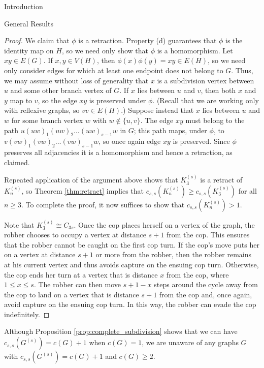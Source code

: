 \documentclass[12pt]{amsart}
\newcommand{\comment}[1]{\textcolor{red}{#1}}
\newtheorem{conjecture}[lemma]{Conjecture}
\theoremstyle{definition}
\newcommand{\speeds}{c_{s,s}}
\begin{document}
\begin{section}{Introduction}
\begin{section}{General Results}
\begin{proof}
We claim that $\phi$ is a retraction.  Property (d) guarantees that $\phi$ is the identity map on $H$, so we need only show that $\phi$ is a homomorphism.  Let $xy \in E(G)$.  If $x,y \in V(H)$, then $\phi(x)\phi(y) = xy \in E(H)$, so we need only consider edges for which at least one endpoint does not belong to $G$.  Thus, we may assume without loss of generality that $x$ is a subdivision vertex between $u$ and some other branch vertex of $G$.  If $x$ lies between $u$ and $v$, then both $x$ and $y$ map to $v$, so the edge $xy$ is preserved under $\phi$.  (Recall that we are working only with reflexive graphs, so $vv \in E(H)$.)  Suppose instead that $x$ lies between $u$ and $w$ for some branch vertex $w$ with $w \not\in \{u,v\}$.  The edge $xy$ must belong to the path $u(uw)_1(uw)_2\dots (uw)_{s-1}w$ in $G$; this path maps, under $\phi$, to $v(vw)_1(vw)_2\dots (vw)_{s-1}w$, so once again edge $xy$ is preserved.  Since $\phi$ preserves all adjacencies it is a homomorphism and hence a retraction, as claimed.

Repeated application of the argument above shows that $K_3^{(s)}$ is a retract of $K_n^{(s)}$, so Theorem \ref{thm:retract} implies that $\speeds(K_n^{(s)}) \ge \speeds(K_{3}^{(s)})$ for all $n\ge 3$.  To complete the proof, it now suffices to show that $\speeds(K_n^{(s)}) > 1$.  

Note that $K_3^{(s)}\cong C_{3s}$.  Once the cop places herself on a vertex of the graph, the robber chooses to occupy a vertex at distance $s+1$ from the cop.  This ensures that the robber cannot be caught on the first cop turn.  If the cop's move puts her on a vertex at distance $s+1$ or more from the robber, then the robber remains at his current vertex and thus avoids capture on the ensuing cop turn.  Otherwise, the cop ends her turn at a vertex that is distance $x$ from the cop, where $1\le x\le s$.  The robber can then move $s+1-x$ steps around the cycle away from the cop to land on a vertex that is distance $s+1$ from the cop and, once again, avoid capture on the ensuing cop turn.  In this way, the robber can evade the cop indefinitely.
\end{proof}

Although Proposition \ref{prop:complete_subdivision} shows that we can have $\speeds(G^{(s)}) = c(G)+1$ when $c(G) = 1$, we are unaware of any graphs $G$ with  $\speeds(G^{(s)}) = c(G)+1$ and $c(G) \ge 2$. 
\\


\end{section}
\end{section}
\end{document}
